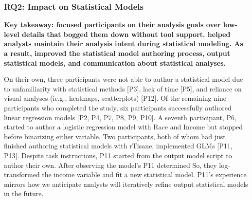 
\subsubsection{RQ2: \rTisanes Impact on Statistical Models}
\textbf{Key takeaway: 
\rTisane focused participants on their analysis goals over low-level details
that bogged them down without tool support. 
\rTisane helped analysts maintain their analysis intent during statistical modeling.
As a result, \rTisane improved the
statistical model authoring process, output statistical models, and
communication about statistical analyses. 
}

On their own, three participants were not able to author a statistical model due
to unfamiliarity with statistical methods [P3], lack of time [P5], and reliance
on visual analyses (ie.g., heatmaps, scatterplots) [P12]. Of the remaining nine
participants who completed the study, six participants successfully authored
linear regression models [P2, P4, P7, P8, P9, P10]. A seventh participant, P6,
started to author a logistic regression model with Race and Income but stopped
before binarizing either variable. Two participants, both of whom had just
finished authoring statistical models with rTisane, implemented GLMs [P11, P13].
Despite task instructions, P11 started from the \rTisane output model script to
author their own.  After observing the model's  P11 determined  So, they log-transformed the income variable and fit a new statistical model. 
P11’s experience mirrors how we anticipate analysts will iteratively refine
\rTisane output statistical models in the future.

